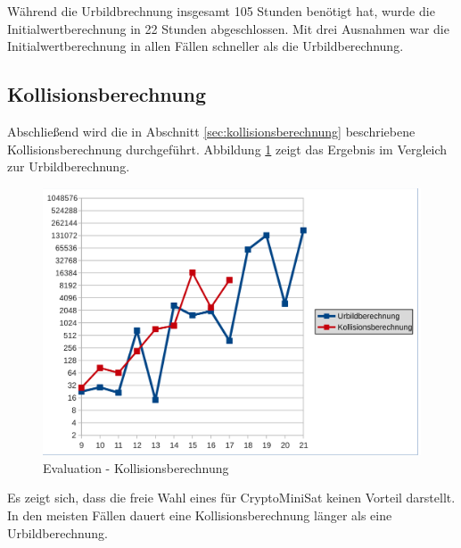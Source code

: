 Während die Urbildbrechnung insgesamt 105 Stunden benötigt hat, wurde die Initialwertberechnung in 22 Stunden
abgeschlossen. Mit drei Ausnahmen war die Initialwertberechnung in allen Fällen schneller als die Urbildberechnung.

\subsection{Kollisionsberechnung}
Abschließend wird die in Abschnitt \ref{sec:kollisionsberechnung} beschriebene Kollisionsberechnung durchgeführt.
Abbildung \ref{fig:eval_kollision} zeigt das Ergebnis im Vergleich zur Urbildberechnung. \clearpage
\begin{figure}[!h]
  \centering
  \includegraphics[scale=0.55]{images/eval_kollision}
  \caption{Evaluation - Kollisionsberechnung}
  \label{fig:eval_kollision}
\end{figure}

Es zeigt sich, dass die freie Wahl eines  für CryptoMiniSat keinen Vorteil darstellt. In den meisten Fällen
dauert eine Kollisionsberechnung länger als eine Urbildberechnung. 